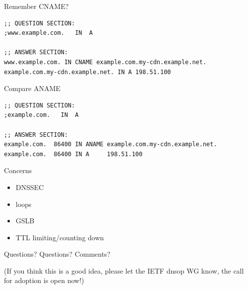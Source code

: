 \documentclass{beamer}
\begin{document}
\begin{frame}[fragile]{Remember CNAME?}
  \begin{verbatim}
;; QUESTION SECTION:
;www.example.com.   IN  A

;; ANSWER SECTION:
www.example.com. IN CNAME example.com.my-cdn.example.net.
example.com.my-cdn.example.net. IN A 198.51.100
  \end{verbatim}
\end{frame}

\begin{frame}[fragile]{Compare ANAME}
  \begin{verbatim}
;; QUESTION SECTION:
;example.com.   IN  A

;; ANSWER SECTION:
example.com.  86400 IN ANAME example.com.my-cdn.example.net.
example.com.  86400 IN A     198.51.100
  \end{verbatim}
\end{frame}

\begin{frame}{Concerns}
  \begin{itemize}
    \item DNSSEC
    \item loops
    \item GSLB
    \item TTL limiting/counting down
  \end{itemize}
\end{frame}

\begin{frame}{Questions?}
Questions? Comments?

(If you think this is a good idea, please let the IETF dnsop WG know, the call for adoption is open now!)
\end{frame}
\end{document}

